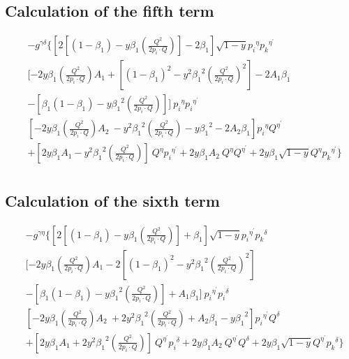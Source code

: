 \subsection*{Calculation of the fifth term}

\begin{equation}
\begin{split} 
&-g^{{{\gamma}}{{\delta}}}\lbrace[2[(1-\beta_1)-y\beta_1 (\frac{Q^2}{2p_i \cdot Q})]-2\beta_1] \sqrt{1-y}{p_i}^{{\eta}}{{p_k}^{{\eta}^{\prime}}}\\
&[-2y {\beta_1} (\frac{Q^2}{2p_i \cdot Q}) A_1+[(1-\beta_1)^2-y^2 {\beta_1}^2 (\frac{Q^2}{2p_i \cdot Q})^2]-2A_1\beta_1\\
&-[\beta_1(1-\beta_1)-y {\beta_1}^2 (\frac{Q^2}{2p_i \cdot Q})] ]\:{p_i}^{{\eta}}{p_i}^{{\eta}^{\prime}}\\
&[-2y {\beta_1} (\frac{Q^2}{2p_i \cdot Q}) A_2\: -y^2 {\beta_1}^2 (\frac{Q^2}{2p_i \cdot Q})-y {\beta_1}^2 -2A_2\beta_1 ]{p_i}^{{\eta}}{Q}^{{\eta}^{\prime}}\\
&+[2y {\beta_1} A_1-y^2 {\beta_1}^2 (\frac{Q^2}{2p_i \cdot Q})] \:{Q}^{{\eta}}{p_i}^{{\eta}^{\prime}}+2y {\beta_1} A_2 \:{Q}^{{\eta}}{Q}^{{\eta}^{\prime}}+2y {\beta_1}\sqrt{1-y}{Q}^{{\eta}}{{p_k}^{{\eta}^{\prime}}}\rbrace\\
\end{split}
\end{equation}

\subsection*{Calculation of the sixth term}
\begin{equation}
\begin{split}
&-g^{{{\gamma}}{{\eta}}}\lbrace[2[(1-\beta_1)-y\beta_1 (\frac{Q^2}{2p_i \cdot Q})]+\beta_1 ] \sqrt{1-y}{p_i}^{{\eta}^{\prime}}{{p_k}^{{\delta}}}\\
&[-2y {\beta_1} (\frac{Q^2}{2p_i \cdot Q}) A_1-2[(1-\beta_1)^2-y^2 {\beta_1}^2 (\frac{Q^2}{2p_i \cdot Q})^2]\\
&-[\beta_1(1-\beta_1)-y {\beta_1}^2 (\frac{Q^2}{2p_i \cdot Q})] +A_1\beta_1 ] \:{p_i}^{{\eta}^{\prime}}{p_i}^{{\delta}}\\
&[-2y {\beta_1} (\frac{Q^2}{2p_i \cdot Q}) A_2\:+2y^2 {\beta_1}^2 (\frac{Q^2}{2p_i \cdot Q})+A_2\beta_1 -y {\beta_1}^2 ] {p_i}^{{\eta}^{\prime}}{Q}^{{\delta}}\\
&+[2y {\beta_1} A_1+2y^2 {\beta_1}^2 (\frac{Q^2}{2p_i \cdot Q})] \:{Q}^{{\eta}^{\prime}}{p_i}^{{\delta}}+2y {\beta_1} A_2 \:{Q}^{{\eta}^{\prime}}{Q}^{{\delta}}+2y {\beta_1}\sqrt{1-y}{Q}^{{\eta}^{\prime}}{{p_k}^{{\delta}}}
\rbrace
\end{split}
\end{equation}


